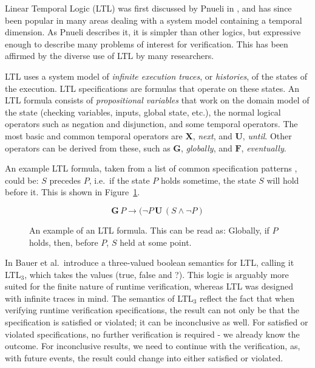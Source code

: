 \documentclass[a4paper,11pt]{kth-mag}
\begin{document}
Linear Temporal Logic (LTL) was first discussed by Pnueli in \cite{pnueli77},
and has since been popular in many areas dealing with a system model containing
a temporal dimension. As Pnueli describes it, it is simpler than other logics,
but expressive enough to describe many problems of interest for verification.
This has been affirmed by the diverse use of LTL by many researchers.

LTL uses a system model of \textit{infinite execution traces}, or
\textit{histories}, of the states of the execution. LTL specifications are
formulas that operate on these states. An LTL formula consists of
\textit{propositional variables} that work on the domain model of the state
(checking variables, inputs, global state, etc.), the normal logical operators
such as negation and disjunction, and some temporal operators. The most basic
and common temporal operators are $\boldsymbol{X}$, \textit{next}, and
$\boldsymbol{U}$, \textit{until}. Other operators can be derived from these,
such as $\boldsymbol{G}$, \textit{globally}, and $\boldsymbol{F}$,
\textit{eventually}.

An example LTL formula, taken from a list of common specification patterns
\cite{dwyer99patterns}, could be: $S$ precedes $P$, i.e.\ if the state $P$
holds sometime, the state $S$ will hold before it. This is shown in
Figure~\ref{figure-ltl}.

\begin{figure}[h!]
	\[
	\boldsymbol{G} \, P \rightarrow (\neg P \, \boldsymbol{U} \, (S \wedge \neg P)
	\]

	\caption{An example of an LTL formula. This can be read as: Globally, if $P$
	holds, then, before $P$, $S$ held at some point.}
	\label{figure-ltl}
\end{figure}

In \cite{bauer06monitoring} Bauer et al.\ introduce a three-valued boolean
semantics for LTL, calling it LTL$_3$, which takes the values (true, false and
?).  This logic is arguably more suited for the finite nature of runtime
verification, whereas LTL was designed with infinite traces in mind. The
semantics of LTL$_3$ reflect the fact that when verifying runtime verification
specifications, the result can not only be that the specification is satisfied
or violated; it can be inconclusive as well. For satisfied or violated
specifications, no further verification is required - we already know the
outcome. For inconclusive results, we need to continue with the verification,
as, with future events, the result could change into either satisfied or
violated.
\end{document}
